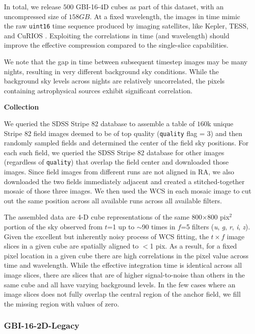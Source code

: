 In total, we release $500$ GBI-16-4D cubes as part of this dataset, with an uncompressed size of $158 GB$. At a fixed wavelength, the images in time mimic the raw {\tt uint16} time sequence produced by imaging satellites, like Kepler, TESS, and CuRIOS \citep{2022cosp...44.1985G}. Exploiting the correlations in time (and wavelength) should improve the effective compression compared to the single-slice capabilities.

We note that the gap in time between subsequent timestep images may be many nights, resulting in very different background sky conditions. While the background sky levels across nights are relatively uncorrelated, the pixels containing astrophysical sources exhibit significant correlation. 

\textbf{Collection}

We queried the SDSS Stripe 82 database to assemble a table of $160$k unique Stripe 82 field images deemed to be of top quality ({\tt quality} flag = 3) and then randomly sampled fields and determined the center of the field sky positions. For each such field, we queried the SDSS Stripe 82 database for other images (regardless of {\tt quality}) that overlap the field center and downloaded those images. Since field images from different runs are not aligned in RA, we also downloaded the two fields immediately adjacent and created a stitched-together mosaic of those three images. We then used the WCS in each mosaic image to cut out the same position across all available runs across all available filters.

The assembled data are 4-D cube representations of the same 800$\times$800 pix$^2$ portion of the sky observed from $t$=1 up to $\sim$90 times in $f$=5 filters ({\it u}, {\it g}, {\it r}, {\it i}, {\it z}). Given the excellent but inherently noisy process of WCS fitting, the $t\times f$ image slices in a given cube are spatially aligned to $<$1 pix. As a result, for a fixed pixel location in a given cube there are high correlations in the pixel value across time and wavelength. While the effective integration time is identical across all image slices, there are slices that are of higher signal-to-noise than others in the same cube and all have varying background levels. In the few cases where an image slices does not fully overlap the central region of the anchor field, we fill the missing region with values of zero.

\subsubsection{GBI-16-2D-Legacy} 

